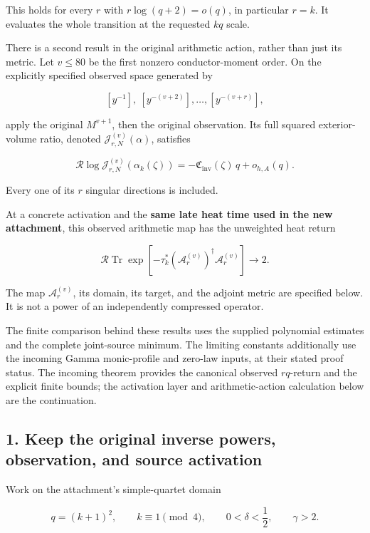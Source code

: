 \documentclass[11pt]{article}
\begin{document}
This holds for every \(r\) with \(r\log(q+2)=o(q)\), in particular \(r=k\). It evaluates the whole transition at the requested \(kq\) scale.

There is a second result in the original arithmetic action, rather than just its metric. Let \(v\le80\) be the first nonzero conductor-moment order. On the explicitly specified observed space generated by

\[
[y^{-1}],\ [y^{-(v+2)}],\ldots,[y^{-(v+r)}],
\]

apply the original \(M^{v+1}\), then the original observation. Its full squared exterior-volume ratio, denoted \(\mathscr J^{(v)}_{r,N}(\alpha)\), satisfies

\[
\boxed{
\mathcal R\log \mathscr J^{(v)}_{r,N}(\alpha_k(\zeta))
=
-\mathfrak C_{\mathrm{inv}}(\zeta)\,q+o_{h,A}(q).
}
\tag{3}
\]

Every one of its \(r\) singular directions is included.

At a concrete activation and the \textbf{same late heat time used in the new attachment}, this observed arithmetic map has the unweighted heat return

\[
\boxed{
\mathcal R\operatorname{Tr}
\exp\!\left[-\tau_k^*
(\mathscr A_r^{(v)})^\dagger\mathscr A_r^{(v)}\right]
\longrightarrow2.
}
\tag{4}
\]

The map \(\mathscr A_r^{(v)}\), its domain, its target, and the adjoint metric are specified below. It is not a power of an independently compressed operator.

The finite comparison behind these results uses the supplied polynomial estimates and the complete joint-source minimum. The limiting constants additionally use the incoming Gamma monic-profile and zero-law inputs, at their stated proof status. The incoming theorem provides the canonical observed \(rq\)-return and the explicit finite bounds; the activation layer and arithmetic-action calculation below are the continuation.

\subsection{1. Keep the original inverse powers, observation, and source activation}\label{keep-the-original-inverse-powers-observation-and-source-activation}

Work on the attachment's simple-quartet domain

\[
q=(k+1)^2,\qquad k\equiv1\pmod4,\qquad
0<\delta<\frac12,\qquad\gamma>2.
\]
\end{document}
